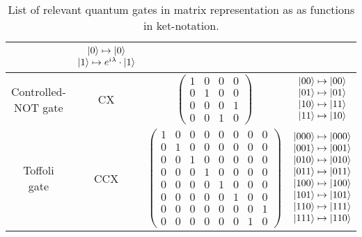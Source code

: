 \begin{table}[htp]
\begin{tabular}{c|c|cc}
                                    & $\begin{matrix} \ket{0} \mapsto \ket{0} \\ \ket{1} \mapsto e^{i\lambda} \cdot \ket{1} \end{matrix}$             \\ \hline
    Controlled-NOT gate          & CX     
                                    & $\begin{pmatrix} 1 & 0 & 0 & 0\\ 0 & 1 & 0 & 0\\ 0 & 0 & 0 & 1\\ 0 & 0 & 1 & 0 \end{pmatrix}$       
                                    & $\begin{matrix} \ket{00} \mapsto \ket{00} \\ \ket{01} \mapsto \ket{01} \\ \ket{10} \mapsto \ket{11} \\ \ket{11} \mapsto \ket{10} \end{matrix}$\\ \hline
    Toffoli  gate                & CCX     
                                    & $\begin{pmatrix} 1 & 0 & 0 & 0 & 0 & 0 & 0 & 0 \\ 0 & 1 & 0 & 0 & 0 & 0 & 0 & 0 \\ 0 & 0 & 1 & 0 & 0 & 0 & 0 & 0 \\ 0 & 0 & 0 & 1 & 0 & 0 & 0 & 0 \\ 0 & 0 & 0 & 0 & 1 & 0 & 0 & 0 \\ 0 & 0 & 0 & 0 & 0 & 1 & 0 & 0 \\ 0 & 0 & 0 & 0 & 0 & 0 & 0 & 1 \\ 0 & 0 & 0 & 0 & 0 & 0 & 1 & 0 \end{pmatrix}$       
                                    & $\begin{matrix} \ket{000} \mapsto \ket{000} \\ \ket{001} \mapsto \ket{001} \\ \ket{010} \mapsto \ket{010} \\ \ket{011} \mapsto \ket{011} \\  \ket{100} \mapsto \ket{100} \\ \ket{101} \mapsto \ket{101} \\ \ket{110} \mapsto \ket{111} \\ \ket{111} \mapsto \ket{110} \end{matrix}$            
    \end{tabular}
    \caption{List of relevant quantum gates in matrix representation as as functions in ket-notation.}
    \label{tab:gates}
\end{table}

